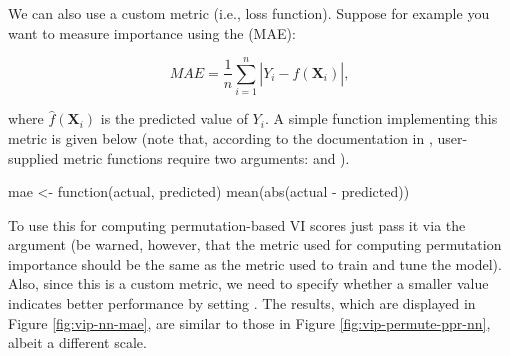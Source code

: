 We can also use a custom metric (i.e., loss function). Suppose for
example you want to measure importance using the
 (MAE):

\begin{equation}
  MAE = \frac{1}{n}\sum_{i = 1}^n\left|Y_i - \widehat{f}\left(\boldsymbol{X}_i\right)\right|,
\end{equation}

where \(\widehat{f}\left(\boldsymbol{X}_i\right)\) is the predicted
value of \(Y_i\). A simple function implementing this metric is given
below (note that, according to the documentation in ,
user-supplied metric functions require two arguments:  and
).

\begin{Schunk}
\begin{Sinput}
mae <- function(actual, predicted) {
  mean(abs(actual - predicted))
}
\end{Sinput}
\end{Schunk}

To use this for computing permutation-based VI scores just pass it via
the  argument (be warned, however, that the metric used for
computing permutation importance should be the same as the metric used
to train and tune the model). Also, since this is a custom metric, we
need to specify whether a smaller value indicates better performance by
setting . The results, which are
displayed in Figure \ref{fig:vip-nn-mae}, are similar to those in Figure
\ref{fig:vip-permute-ppr-nn}, albeit a different scale.

